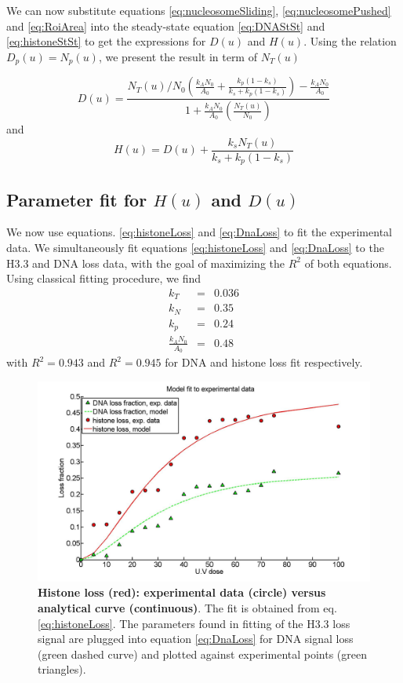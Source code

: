 \documentclass[12pt]{article}
\begin{document}
We can now substitute equations \ref{eq:nucleosomeSliding}, \ref{eq:nucleosomePushed} and \ref{eq:RoiArea} into the steady-state equation \ref{eq:DNAStSt} and \ref{eq:histoneStSt} to get the expressions for $D(u)$ and $H(u)$. Using the relation $D_p(u)=N_p(u)$, we present the result in term of $N_T(u)$


\begin{equation}
\label{eq:DnaLoss}
D(u) = \frac{N_T(u)/N_0\left(\frac{k_AN_0}{A_0}+\frac{k_p(1-k_s)}{k_s+k_p(1-k_s)}\right)-\frac{k_AN_0}{A_0}}{1+\frac{k_AN_0}{A_0}\left(\frac{N_T(u)}{N_0}\right)}
\end{equation}
and 
\begin{equation}\label{eq:histoneLoss}
H(u) = D(u)+\frac{k_sN_T(u)}{k_s+k_p(1-k_s)}
\end{equation}

\subsection{Parameter fit for $H(u)$ and $D(u)$ }\label{subsection:parameterFit}
We now use equations. \ref{eq:histoneLoss} and \ref{eq:DnaLoss} to fit the experimental data. We simultaneously fit equations \ref{eq:histoneLoss} and \ref{eq:DnaLoss} to the H3.3 and DNA loss data, with the goal of maximizing the $R^2$ of both equations. 
Using classical fitting procedure, we find 
\begin{eqnarray*}
k_T &=&  0.036\\
k_N &=&  0.35\\
k_p &=&  0.24\\
\frac{k_AN_0}{A_0} &=&  0.48 
\end{eqnarray*}
with $R^2=0.943$ and $R^2=0.945$ for DNA and histone loss fit respectively.

\begin{figure}[H]
\centering
\includegraphics[width=0.6\linewidth, height=0.3\textheight]{histoneAndDnaVsUvDoseModelFit}
\caption{\textbf{Histone loss (red): experimental data (circle) versus analytical curve (continuous)}. The fit is obtained from  eq. \ref{eq:histoneLoss}. The parameters found in fitting of the H3.3 loss signal are plugged into equation \ref{eq:DnaLoss} for DNA signal loss (green dashed curve) and plotted against experimental points (green triangles).}
\label{fig:histoneAndDnaVsUvDoseModelFit}
\end{figure}
\end{document}
